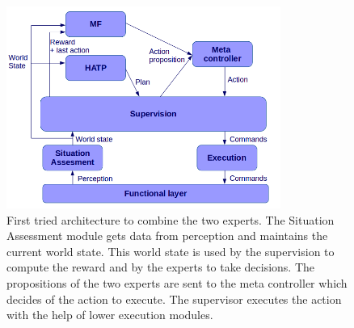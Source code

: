 \documentclass[english,a4paper,11pt,twoside]{StyleThese}
\begin{document}
\begin{figure}[!h]
	\centering
    \includegraphics[width=0.8\textwidth]{figs/Chapter7/FirstArchi.png}
    \caption{First tried architecture to combine the two experts. The Situation Assessment module gets data from perception and maintains the current world state. This world state is used by the supervision to compute the reward and by the experts to take decisions. The propositions of the two experts are sent to the meta controller which decides of the action to execute. The supervisor executes the action with the help of lower execution modules.}
    \label{fig:FirstArchi}
\end{figure}
\end{document}
